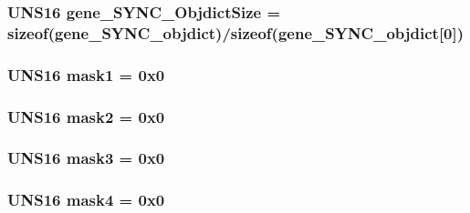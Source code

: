 \subsubsection{\setlength{\rightskip}{0pt plus 5cm}UNS16 {\bf gene\_\-SYNC\_\-Objdict\-Size} = sizeof({\bf gene\_\-SYNC\_\-objdict})/sizeof({\bf gene\_\-SYNC\_\-objdict}[0])}\label{objdict_8c_f0326a35a88d3e7838f170a8369eec6c}


\subsubsection{\setlength{\rightskip}{0pt plus 5cm}UNS16 {\bf mask1} = 0x0}\label{objdict_8c_c917a1516c699e38ca1335671fed3ccb}


\subsubsection{\setlength{\rightskip}{0pt plus 5cm}UNS16 {\bf mask2} = 0x0}\label{objdict_8c_7dc98c2ef9a08148e275949b376282cb}


\subsubsection{\setlength{\rightskip}{0pt plus 5cm}UNS16 {\bf mask3} = 0x0}\label{objdict_8c_017e60df8f7a5ae5e2dddaf458045e8d}


\subsubsection{\setlength{\rightskip}{0pt plus 5cm}UNS16 {\bf mask4} = 0x0}\label{objdict_8c_e0007c46695fc121ef6c2a6e6a511d17}


